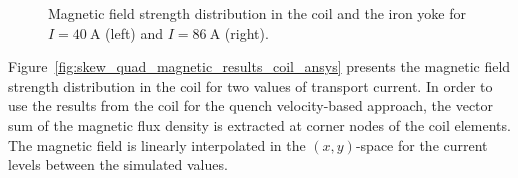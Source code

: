 \begin{figure}[H]
    \centering
    \caption{Magnetic field strength distribution in the coil and the iron yoke for $I=40~\text{A}$ (left) and $I=86~\text{A}$ (right).}
    \label{fig:skew_quad_magnetic_results_geometry_ansys}
\end{figure}

Figure~\ref{fig:skew_quad_magnetic_results_coil_ansys} presents the magnetic field strength distribution in the coil for two values of transport current. In order to use the results from the coil for the quench velocity-based approach, the vector sum of the magnetic flux density is extracted at corner nodes of the coil elements. The magnetic field is linearly interpolated in the $(x,y)$-space for the current levels between the simulated values. 


